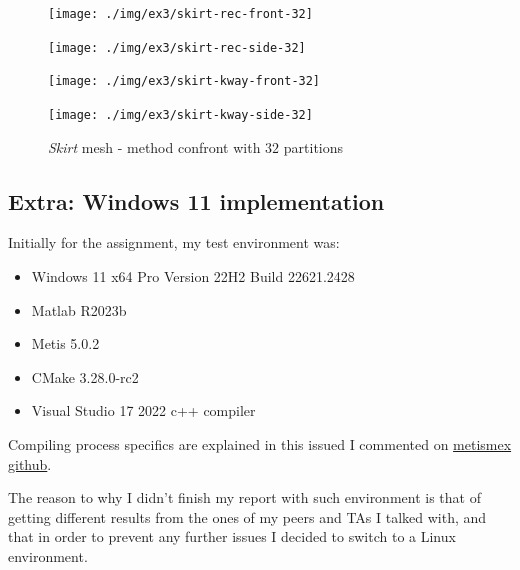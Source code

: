 \documentclass[unicode,11pt,a4paper,oneside,numbers=endperiod,openany]{scrartcl}
\begin{document}
\begin{figure}[H]
    \begin{minipage}[H]{.45\textwidth}
        \centering
        \texttt{[image: ./img/ex3/skirt-rec-front-32]}
        \label{fig:skirt-rec-front-32}
    \end{minipage}
    \hfill
    \begin{minipage}[H]{.45\textwidth}
        \centering
        \texttt{[image: ./img/ex3/skirt-rec-side-32]}
        \label{fig:skirt-rec-side-32}
    \end{minipage}
    \newline
    \begin{minipage}[H]{.45\textwidth}
        \centering
        \texttt{[image: ./img/ex3/skirt-kway-front-32]}
        \label{fig:skirt-kway-front-32}
    \end{minipage}
    \hfill
    \begin{minipage}[H]{.45\textwidth}
        \centering
        \texttt{[image: ./img/ex3/skirt-kway-side-32]}
        \label{fig:skirt-kway-side-32}
    \end{minipage}
    \label{fig:skirt-rec-kway-32}
    \caption{\textit{Skirt} mesh - method confront with $32$ partitions}
\end{figure}
\cleardoublepage

\subsection*{Extra: Windows 11 implementation}

Initially for the assignment, my test environment was:
\begin{itemize}
    \item Windows 11 x64 Pro Version 22H2 Build 22621.2428
    \item Matlab R2023b
    \item Metis 5.0.2
    \item CMake 3.28.0-rc2
    \item Visual Studio 17 2022 c++ compiler
\end{itemize}

Compiling process specifics are explained in this issued I commented on \href{https://github.com/dgleich/metismex/issues/2\#issuecomment-1772906999}{metismex github}.

The reason to why I didn't finish my report with such environment is that of getting different results from the ones of
my peers and TAs I talked with, and that in order to prevent any further issues I decided to switch to a Linux environment.
\end{document}
